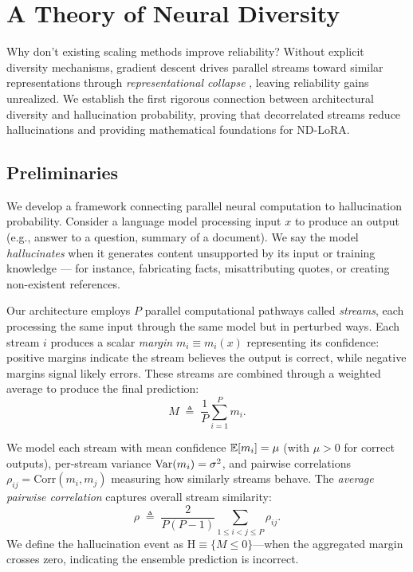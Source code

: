 \documentclass{article} %
\newcommand{\HALL}{\mathrm{H}} %
\begin{document}
\section{A Theory of Neural Diversity}
Why don't existing scaling methods improve reliability? Without explicit diversity mechanisms, gradient descent
drives parallel streams toward similar representations through \emph{representational collapse}
\citep{jing2022dimensional}, leaving reliability gains unrealized. We establish the first rigorous
connection between architectural diversity and hallucination probability, proving that decorrelated streams
reduce hallucinations and providing mathematical foundations for ND-LoRA.

\subsection{Preliminaries}
We develop a framework connecting parallel neural computation to hallucination probability. Consider a language
model processing input $x$ to produce an output (e.g., answer to a question, summary of a document). We say the
model \emph{hallucinates} when it generates content unsupported by its input or training knowledge --- for instance,
fabricating facts, misattributing quotes, or creating non-existent references.

Our architecture employs $P$ parallel computational pathways called \emph{streams}, each processing the same input
through the same model but in perturbed ways. Each stream $i$ produces a scalar \emph{margin} $m_i \equiv
m_i(x)$ representing its confidence: positive margins indicate the stream believes the output is
correct, while negative margins signal likely errors. These streams are combined through a weighted average
to produce the final prediction:
\begin{equation}
  M \;\triangleq\; \frac{1}{P}\sum_{i=1}^P m_i.
\end{equation}

We model each stream with mean confidence $\mathbb{E}[m_i]=\mu$ (with $\mu>0$ for correct outputs), per-stream variance
$\mathrm{Var}(m_i)=\sigma^2$, and pairwise correlations $\rho_{ij}=\mathrm{Corr}(m_i,m_j)$ measuring how similarly
streams behave. The \emph{average pairwise correlation} captures overall stream similarity:
\begin{equation}
  \rho \;\triangleq\; \frac{2}{P(P-1)}\sum_{1\le i<j\le P}\rho_{ij}.
\end{equation}
We define the hallucination event as $\HALL \equiv \{M\le 0\}$---when the aggregated margin crosses zero,
indicating the ensemble prediction is incorrect.
\end{document}
